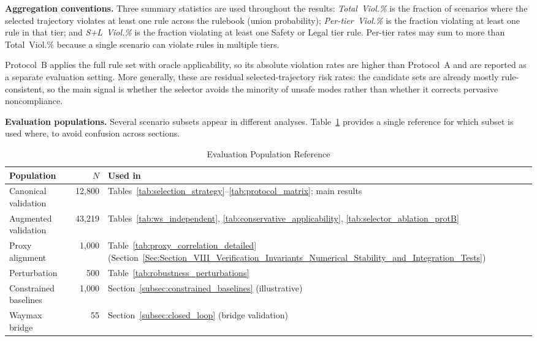 \noindent\textbf{Aggregation conventions.}  Three summary statistics are used throughout the results: \emph{Total~Viol.\%} is the fraction of scenarios where the selected trajectory violates at least one rule across the rulebook (union probability); \emph{Per-tier~Viol.\%} is the fraction violating at least one rule in that tier; and \emph{S+L~Viol.\%} is the fraction violating at least one Safety or Legal tier rule. Per-tier rates may sum to more than Total~Viol.\% because a single scenario can violate rules in multiple tiers.

\noindent Protocol~B applies the full rule set with oracle applicability, so its absolute violation rates are higher than Protocol~A and are reported as a separate evaluation setting.  More generally, these are residual selected-trajectory risk rates: the candidate sets are already mostly rule-consistent, so the main signal is whether the selector avoids the minority of unsafe modes rather than whether it corrects pervasive noncompliance.

\noindent\textbf{Evaluation populations.}  Several scenario subsets appear in different analyses.  Table~\ref{tab:eval_populations} provides a single reference for which subset is used where, to avoid confusion across sections.

\begin{table}[t]
\centering
\caption{Evaluation Population Reference}
\label{tab:eval_populations}
\setlength{\tabcolsep}{3pt}
\begin{tabular}{lrl}
\toprule
\textbf{Population} & \textbf{$N$} & \textbf{Used in} \\
\midrule
Canonical validation & 12{,}800 & Tables~\ref{tab:selection_strategy}--\ref{tab:protocol_matrix}; main results \\
Augmented validation & 43{,}219 & Tables~\ref{tab:ws_independent}, \ref{tab:conservative_applicability}, \ref{tab:selector_ablation_protB} \\
Proxy alignment & 1{,}000 & Table~\ref{tab:proxy_correlation_detailed} (Section~\ref{Sec:Section_VIII_Verification_Invariants_Numerical_Stability_and_Integration_Tests}) \\
Perturbation & 500 & Table~\ref{tab:robustness_perturbations} \\
Constrained baselines & 1{,}000 & Section~\ref{subsec:constrained_baselines} (illustrative) \\
Waymax bridge & 55 & Section~\ref{subsec:closed_loop} (bridge validation) \\
\bottomrule
\end{tabular}
\end{table}

